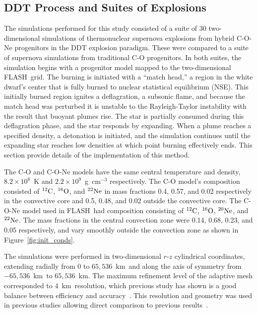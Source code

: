 \documentclass[preprint2]{aastex63}
\newcommand{\C}[1]{\ensuremath{{}^{#1}{\rm C}}}
\newcommand{\Ox}[1]{\ensuremath{{}^{#1}{\rm O}}}
\newcommand{\Ne}[1]{\ensuremath{{}^{#1}{\rm Ne}}}
\newcommand{\code}[1]{\textsc{#1}}
\newcommand{\FLASH}{\code{FLASH}}
\newcommand{\unitstyle}[1]{\ensuremath{\mathrm{#1}}}
\newcommand{\kilo}{\unitstyle{k}}
\newcommand{\meter}{\unitstyle{m}}
\newcommand{\km}{\kilo\meter}   %
\begin{document}
\subsection{DDT Process and Suites of Explosions}

The simulations performed for this study consisted of a suite of
30 two-dimensional simulations of
thermonuclear supernova
explosions from hybrid C-O-Ne progenitors in the DDT explosion paradigm. These
were compared to a suite of supernova simulations from traditional
C-O progenitors. In both suites, the simulation
begins with a progenitor model mapped to the two-dimensional
\FLASH\ grid. The burning is initiated with a ``match head,'' a region
in the white dwarf's center that is fully burned to nuclear statistical
equilibrium (NSE).
This initially burned region ignites a deflagration, a subsonic
flame, and because the match head was perturbed it is unstable to
the Rayleigh-Taylor instability with the result that buoyant plumes
rise. The star is partially consumed during this deflagration phase,
and the star responds by expanding.
When a plume reaches a specified density,
a detonation is initiated, and the simulation continues until
the expanding star reaches low densities at which point burning
effectively ends. This section provide details
of the implementation of this method.


The C-O and C-O-Ne models have the same central temperature
and density, $8.2\times 10^8$~K and $2.2\times 10^9$~g~cm$^{-3}$ respectively.
The C-O model's composition consisted of \C{12}, \Ox{16}, and \Ne{22} in mass fractions 0.4, 0.57, and 0.02 respectively in the convective core and 0.5, 0.48, and 0.02 outside the convective core.
The C-O-Ne model used in \FLASH\ had composition consisting of \C{12}, \Ox{16}, \Ne{20}, and \Ne{22}.
The mass fractions in the central convection zone were 0.14, 0.68, 0.23, and 0.05 respectively, and vary smoothly outside the convection zone as shown in Figure~\ref{fig:init_conds}.

The simulations were performed in two-dimensional $r$-$z$
cylindrical coordinates, extending radially from 0 to
$65,536$~\km\ and along the axis of symmetry from $-65,536$~\km\ to
$65,536$~\km. The maximum refinement level of the adaptive mesh
corresponded to $4$~\km\ resolution, which previous study has shown
is a good balance between efficiency and
accuracy~\citep{townsley.calder.ea:flame,townetal2009}.
This resolution and geometry was used in previous studies
allowing direct comparison to previous results~\citep{Kruegeretal2012}.
\end{document}
